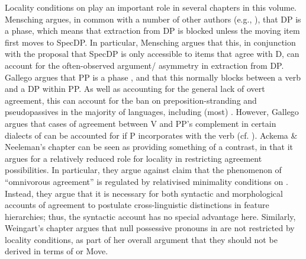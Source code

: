 \documentclass[output=paper]{langsci/langscibook}
\begin{document}
Locality conditions on  play an important role in several chapters in this volume. Mensching argues, in common with a number of other authors (e.g., \citealt{Svenonius2004,Bošković2005,Heck2009,Reeve2018}), that DP is a phase, which means that extraction from DP is blocked unless the moving item first moves to SpecDP. In particular, Mensching argues that this, in conjunction with the proposal that SpecDP is only accessible to items that agree with D, can account for the often-observed argument\slash {} asymmetry in extraction from DP. Gallego argues that PP is a phase \citep{Abels2003,Abels2012}, and that this normally blocks  between a verb and a DP within PP. As well as accounting for the general lack of overt agreement, this can account for the ban on preposition-stranding and pseudopassives in the majority of languages, including (most)  \citep{Law2006}. However, Gallego argues that cases of agreement between V and PP’s complement in certain dialects of  can be accounted for if P incorporates with the verb (cf. \citealt{Hornstein1981,Law2006}). Ackema \& Neeleman’s chapter can be seen as providing something of a contrast, in that it argues for a relatively reduced role for locality in restricting agreement possibilities. In particular, they argue against  claim that the phenomenon of ``omnivorous agreement'' is regulated by relativised minimality conditions on . Instead, they argue that it is necessary for both syntactic and morphological accounts of agreement to postulate cross-linguistic distinctions in feature hierarchies; thus, the syntactic account has no special advantage here. Similarly, Weingart’s chapter argues that null possessive pronouns in  are not restricted by locality conditions, as part of her overall argument that they should not be derived in terms of  or Move.
\end{document}
